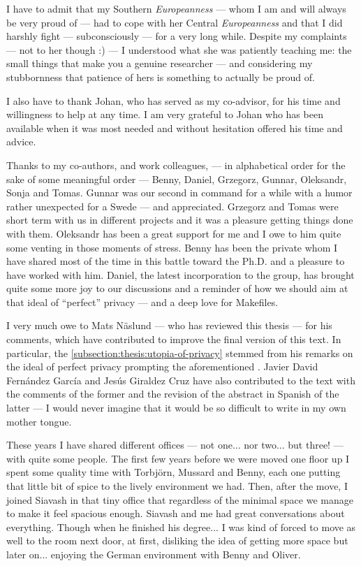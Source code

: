 I have to admit that my Southern \emph{Europeanness} --- whom I am and will always 
be very proud of --- had to cope with her Central \emph{Europeanness} and that I 
did harshly fight --- subconsciously --- for a very long while. Despite my complaints 
--- not to her though :) --- I understood what she was patiently teaching me: the 
small things that make you a genuine researcher --- and considering my stubbornness 
that patience of hers is something to actually be proud of.

I also have to thank Johan, who has served as my co-advisor, for his time and willingness 
to help at any time. I am very grateful to Johan who has been available when it 
was most needed and without hesitation offered his time and advice. 

Thanks to my co-authors, and work colleagues, --- in alphabetical order for the 
sake of some meaningful order --- Benny, Daniel, Grzegorz, Gunnar, Oleksandr, Sonja 
and Tomas. Gunnar was our second in command for a while with a humor rather unexpected 
for a Swede --- and appreciated. Grzegorz and Tomas were short term with us in different 
projects and it was a pleasure getting things done with them. Oleksandr has been 
a great support for me and I owe to him quite some venting in those moments of stress. 
Benny has been the private whom I have shared most of the time in this battle toward 
the Ph.D. and a pleasure to have worked with him. Daniel, the latest incorporation 
to the group, has brought quite some more joy to our discussions and a reminder 
of how we should aim at that ideal of ``perfect'' privacy --- and a deep love for 
Makefiles.

I very much owe to Mats N\"{a}slund --- who has reviewed this thesis --- for his 
comments, which have contributed to improve the final version of this text. In particular, 
the  \cref{subsection:thesis:utopia-of-privacy} 
stemmed from his remarks on the ideal of perfect privacy prompting the aforementioned 
. Javier David Fernández García and 
Jesús Giraldez Cruz have also contributed to the text with the comments of the former 
and the revision of the abstract in Spanish of the latter --- I would never imagine 
that it would be so difficult to write in my own mother tongue.


These years I have shared different offices --- not one... nor two... but three! 
--- with quite some people. The first few years before we were moved one floor up 
I spent some quality time with Torbjörn, Mussard and Benny, each one putting that 
little bit of spice to the lively environment we had. Then, after the move, I joined 
Siavash in that tiny office that regardless of the minimal space we manage to make 
it feel spacious enough. Siavash and me had great conversations about everything.
Though when he finished his degree... I was kind of forced to move as well to the 
room next door, at first, disliking the idea of getting more space but later on... 
enjoying the German environment with Benny and Oliver.

